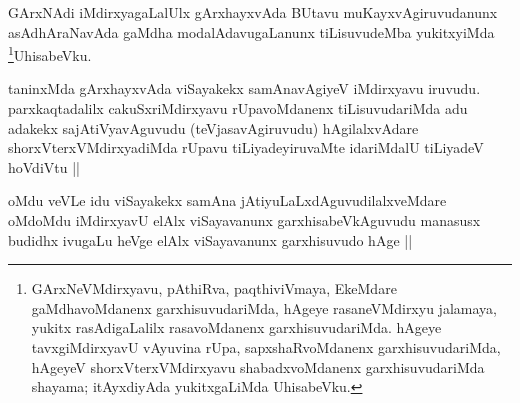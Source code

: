 \begin{artha}
GArxNAdi iMdirxyagaLalUlx gArxhayxvAda BUtavu muKayxvAgiruvudanunx asAdhAraNavAda gaMdha modalAdavugaLanunx tiLisuvudeMba yukitxyiMda \footnote[2]{GArxNeVMdirxyavu, pAthiRva, paqthiviVmaya, EkeMdare gaMdhavoMdanenx garxhisuvudariMda, hAgeye rasaneVMdirxyu jalamaya, yukitx rasAdigaLalilx rasavoMdanenx garxhisuvudariMda. hAgeye tavxgiMdirxyavU vAyuvina rUpa, sapxshaRvoMdanenx garxhisuvudariMda, hAgeyeV shorxVterxVMdirxyavu shabadxvoMdanenx garxhisuvudariMda shayama; itAyxdiyAda yukitxgaLiMda UhisabeVku.}UhisabeVku.
\end{artha}

\begin{artha}
taninxMda gArxhayxvAda viSayakekx samAnavAgiyeV iMdirxyavu iruvudu. parxkaqtadalilx cakuSxriMdirxyavu rUpavoMdanenx tiLisuvudariMda adu adakekx sajAtiVyavAguvudu (teVjasavAgiruvudu) hAgilalxvAdare shorxVterxVMdirxyadiMda rUpavu tiLiyadeyiruvaMte idariMdalU tiLiyadeV hoVdiVtu ||
\end{artha}

\begin{artha}
oMdu veVLe idu viSayakekx samAna jAtiyuLaLxdAguvudilalxveMdare oMdoMdu iMdirxyavU elAlx viSayavanunx garxhisabeVkAguvudu manasusx budidhx ivugaLu heVge elAlx viSayavanunx garxhisuvudo hAge ||
\end{artha}



